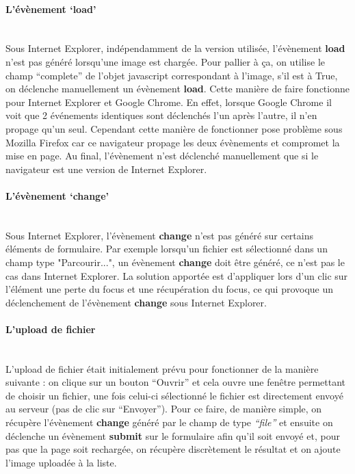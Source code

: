 \documentclass{article}
\begin{document}
\begin{sffamily}
\paragraph{L'évènement `load'}$ $\\

Sous Internet Explorer, indépendamment de la version utilisée, l'évènement \textbf{load} n'est pas généré lorsqu'une image est chargée. Pour pallier à ça, on utilise le 
champ ``complete'' de l'objet javascript correspondant à l'image, s'il est à True, on déclenche manuellement un évènement \textbf{load}. Cette manière de faire fonctionne 
pour Internet Explorer et Google Chrome. En effet, lorsque Google Chrome il voit que 2 événements identiques sont déclenchés l'un après l'autre, il n'en propage qu'un seul. 
Cependant cette manière de fonctionner pose problème sous Mozilla Firefox car ce navigateur propage les deux évènements et compromet la mise en page.
Au final, l'évènement n'est déclenché manuellement que si le navigateur est une version de Internet Explorer.

\paragraph{L'évènement `change'}$ $\\

Sous Internet Explorer, l'évènement \textbf{change} n'est pas généré sur certains éléments de formulaire. Par exemple lorsqu'un fichier est sélectionné dans un champ type 
"Parcourir...", un évènement \textbf{change} doit être généré, ce n'est pas le cas dans Internet Explorer. La solution apportée est d'appliquer lors d'un clic sur l'élément 
une perte du focus et une récupération du focus, ce qui provoque un déclenchement de l'évènement \textbf{change} sous Internet Explorer.

\paragraph{L'upload de fichier}$ $\\

L'upload de fichier était initialement prévu pour fonctionner de la manière suivante : on clique sur un bouton ``Ouvrir'' et cela ouvre une fenêtre permettant de choisir un 
fichier, une fois celui-ci sélectionné le fichier est directement envoyé au serveur (pas de clic sur ``Envoyer''). Pour ce faire, de manière simple, on récupère l'évènement 
\textbf{change} généré par le champ de type \textit{``file''} et ensuite on déclenche un évènement \textbf{submit} sur le formulaire afin qu'il soit envoyé et, pour pas que 
la page soit rechargée, on récupère discrètement le résultat et on ajoute l'image uploadée à la liste.\\


\end{sffamily}
\end{document}
